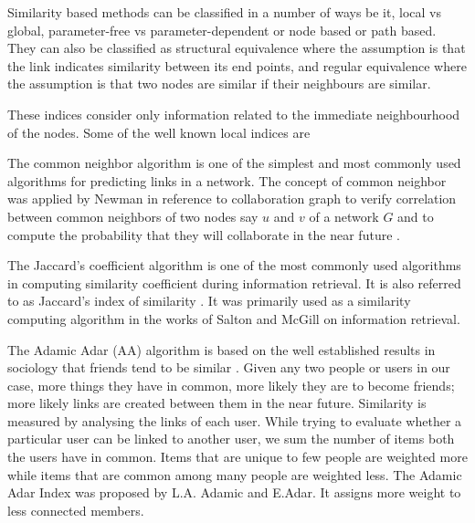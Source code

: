 Similarity based methods can be classified in a number of ways be it, local vs global, parameter-free vs parameter-dependent or node based or path based. They can also be classified as structural equivalence where the assumption is that the link indicates similarity between its end points, and regular equivalence where the assumption is that two nodes are similar if their neighbours are similar.


These indices consider only information related to the immediate neighbourhood of the nodes. Some of the well known local indices are


The common neighbor algorithm is one of the simplest and most commonly used algorithms for predicting links in a network. The concept of common neighbor was applied by Newman in reference to collaboration graph to verify correlation between common neighbors of two nodes say $u$ and $v$ of a network $G$ and to compute the probability that they will collaborate in the near future \cite{newman2001clustering}. 


The Jaccard’s coefficient algorithm is one of the most commonly used algorithms in computing similarity coefficient during information retrieval. It is also referred to as Jaccard’s index of similarity \cite{jaccard1901etude}.  It was primarily used as a similarity computing algorithm in the works of Salton and McGill on information retrieval.


The Adamic Adar (AA) algorithm is based on the well established results in sociology that friends tend to be similar \citep{carley1991theory, feld1981focused}. Given any two people or users in our case, more things they have in common, more likely they are to become friends; more likely links are created between them in the near future. Similarity is measured by analysing the links of each user. While trying to evaluate whether a particular user can be linked to another user, we sum the number of items both the users have in common. Items that are unique to few people are weighted more while items that are common among many people are weighted less. The Adamic Adar Index \cite{adamic2003friends} was proposed by L.A. Adamic and E.Adar. It assigns more weight to less connected members. 

